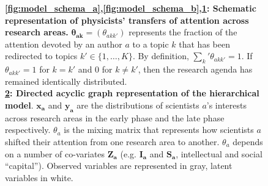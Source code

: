 \documentclass{article}
\begin{document}
\begin{figure}[h]
\begin{subfigure}[b]{0.25\textwidth}
{
          }  
          \caption{\label{fig:model_schema_c}}
     \end{subfigure}\hfill%
\begin{subfigure}[b]{0.22\textwidth}
    \centering
    \caption{\label{fig:model_structure}}
\end{subfigure}

     \caption{\textbf{\ref{fig:model_schema_a},\ref{fig:model_schema_b},\ref{fig:model_schema_c}: Schematic representation of physicists' transfers of attention across research areas.} $\bm{\theta_{ak}}=(\theta_{akk'})$ represents the fraction of the attention devoted by an author $a$ to a topic $k$ that has been redirected to topics $k' \in \{1,\dots,K\}$. By definition, $\sum_k' \theta_{akk'}=1$. If $\theta_{akk'}=1$ for $k=k'$ and 0 for $k\neq k'$, then the research agenda has remained identically distributed.\\
     \textbf{\ref{fig:model_structure}: Directed acyclic graph representation of the hierarchical model}. $\bm{x_a}$ and $\bm{y_a}$ are the distributions of scientists $a$'s interests across research areas in the early phase and the late phase respectively. $\theta_a$ is the mixing matrix that represents how scientists $a$ shifted their attention from one research area to another. $\theta_a$ depends on a number of co-variates $\bm{Z_a}$ (e.g. $\bm{I_a}$ and $\bm{S_a}$, intellectual and social ``capital''). Observed variables are represented in gray, latent variables in white.}
     \label{fig:ei}
 \end{figure}
\end{document}
